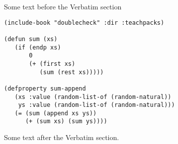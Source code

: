 \documentclass{article}
\begin{document}
Some text before the Verbatim section
\begin{Verbatim}
(include-book "doublecheck" :dir :teachpacks)

(defun sum (xs)
   (if (endp xs)
       0
       (+ (first xs)
          (sum (rest xs)))))

(defproperty sum-append
   (xs :value (random-list-of (random-natural))
    ys :value (random-list-of (random-natural)))
   (= (sum (append xs ys))
      (+ (sum xs) (sum ys))))
\end{Verbatim}
Some text after the Verbatim section.
\end{document}
